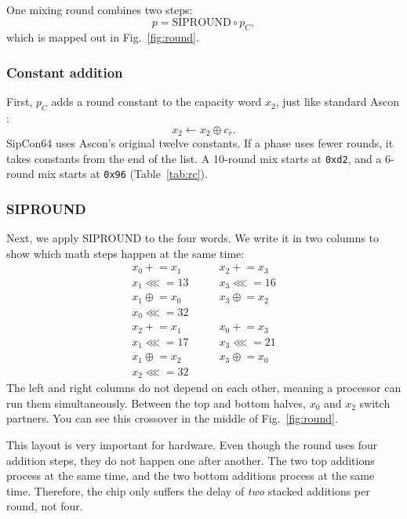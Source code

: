 One mixing round combines two steps:
\begin{equation}
p = \mathrm{SIPROUND}\circ p_{C},
\label{eq:round}
\end{equation}
which is mapped out in Fig.~\ref{fig:round}.

\subsubsection{Constant addition}
First, $p_C$ adds a round constant to the capacity word $x_2$, just like standard Ascon \cite{caesar}:
\begin{equation}
x_2 \leftarrow x_2 \oplus c_r .
\label{eq:pc}
\end{equation}
SipCon64 uses Ascon's original twelve constants. If a phase uses fewer rounds, it takes constants from the end of the list. A 10-round mix starts at \texttt{0xd2}, and a 6-round mix starts at \texttt{0x96} (Table~\ref{tab:rc}).

\subsubsection{SIPROUND}
Next, we apply SIPROUND \cite{siphash} to the four words. We write it in two columns to show which math steps happen at the same time:
\begin{equation}
\begin{array}{ll}
x_0 \mathrel{+}= x_1 & x_2 \mathrel{+}= x_3\\
x_1 \mathrel{\lll}= 13 \qquad & x_3 \mathrel{\lll}= 16\\
x_1 \mathrel{\oplus}= x_0 & x_3 \mathrel{\oplus}= x_2\\
x_0 \mathrel{\lll}= 32 & \\[2pt]
x_2 \mathrel{+}= x_1 & x_0 \mathrel{+}= x_3\\
x_1 \mathrel{\lll}= 17 & x_3 \mathrel{\lll}= 21\\
x_1 \mathrel{\oplus}= x_2 & x_3 \mathrel{\oplus}= x_0\\
x_2 \mathrel{\lll}= 32 &
\end{array}
\label{eq:sipround}
\end{equation}
The left and right columns do not depend on each other, meaning a processor can run them simultaneously. Between the top and bottom halves, $x_0$ and $x_2$ switch partners. You can see this crossover in the middle of Fig.~\ref{fig:round}.

This layout is very important for hardware. Even though the round uses four addition steps, they do not happen one after another. The two top additions process at the same time, and the two bottom additions process at the same time. Therefore, the chip only suffers the delay of \emph{two} stacked additions per round, not four.

